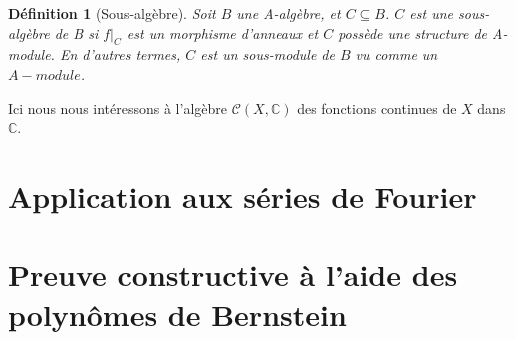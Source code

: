 \documentclass{amsart}
\newtheorem{definition}[subsubsection]{Définition}
\begin{document}
\begin{definition}[Sous-algèbre]
	Soit \( B \) une \textit{A-algèbre}, et \( C \subseteq B \). 
	\( C \) est une \textit{sous-algèbre de B} si 
	\( {f|}_C \) est un morphisme d'anneaux 
	et \( C \) possède une structure de \textit{A-module}. 
	En d'autres termes, \( C \) est un \textit{sous-module} de \( B \) 
	vu comme un \( A-module \).
\end{definition}

Ici nous nous intéressons à l'algèbre \( \mathcal{C} (X,\mathbb{C}) \) des fonctions continues de \( X \) dans \( \mathbb{C} \).
\section{Application aux séries de Fourier}


\section{Preuve constructive à l'aide des polynômes de Bernstein}

\clearpage
\printbibliography
\end{document}
